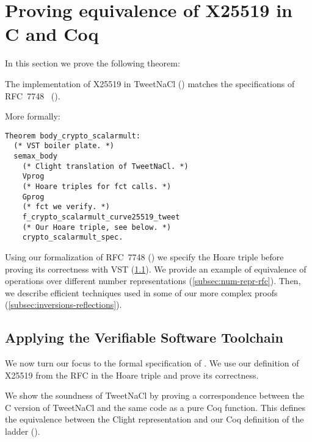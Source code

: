 \section{Proving equivalence of X25519 in C and Coq}
\label{sec:C-Coq}

In this section we prove the following theorem:

\begin{informaltheorem}
The implementation of X25519 in TweetNaCl () matches
the specifications of RFC~7748~\cite{rfc7748} ().
\end{informaltheorem}

More formally:
\begin{lstlisting}[language=Coq]
Theorem body_crypto_scalarmult:
  (* VST boiler plate. *)
  semax_body
    (* Clight translation of TweetNaCl. *)
    Vprog
    (* Hoare triples for fct calls. *)
    Gprog
    (* fct we verify. *)
    f_crypto_scalarmult_curve25519_tweet
    (* Our Hoare triple, see below. *)
    crypto_scalarmult_spec.
\end{lstlisting}

Using our formalization of RFC~7748 () we specify the Hoare
triple before proving its correctness with VST (\ref{subsec:with-VST}).
We provide an example of equivalence of operations over different number
representations (\ref{subsec:num-repr-rfc}). Then, we describe efficient techniques
used in some of our more complex proofs (\ref{subsec:inversions-reflections}).


\subsection{Applying the Verifiable Software Toolchain}
\label{subsec:with-VST}

We now turn our focus to the formal specification of .
We use our definition of X25519 from the RFC in the Hoare triple and prove
its correctness.

We show the soundness of TweetNaCl by proving a correspondence between
the C version of TweetNaCl and the same code as a pure Coq function.
This defines the equivalence between the Clight representation and our Coq
definition of the ladder ().

